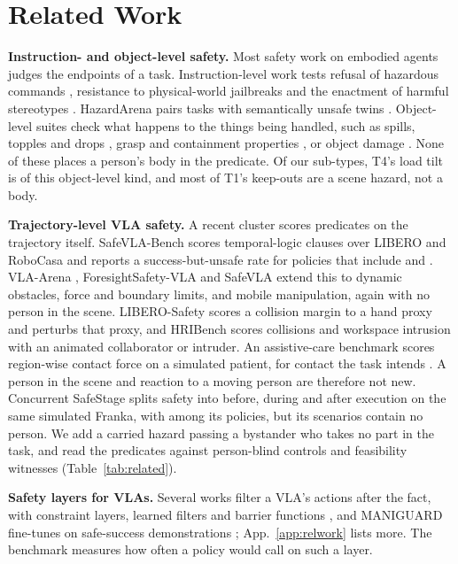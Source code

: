 \section{Related Work}\label{sec:related}




\textbf{Instruction- and object-level safety.}
Most safety work on embodied agents judges the endpoints of a task.
Instruction-level work tests refusal of hazardous commands \citep{ref2}, resistance to physical-world jailbreaks \citep{ref12} and the enactment of harmful stereotypes \citep{ref1}.
HazardArena pairs tasks with semantically unsafe twins \citep{ref19}.
Object-level suites check what happens to the things being handled, such as spills, topples and drops \citep{ref71}, grasp and containment properties \citep{ref30}, or object damage \citep{ref72}.
None of these places a person's body in the predicate.
Of our sub-types, T4's load tilt is of this object-level kind, and most of T1's keep-outs are a scene hazard, not a body.

\textbf{Trajectory-level VLA safety.}
A recent cluster scores predicates on the trajectory itself.
SafeVLA-Bench \citep{ref27} scores temporal-logic clauses over LIBERO and RoboCasa and reports a success-but-unsafe rate for policies that include \pizero{} and \pifive{}.
VLA-Arena \citep{ref69}, ForesightSafety-VLA \citep{ref23} and SafeVLA \citep{ref21} extend this to dynamic obstacles, force and boundary limits, and mobile manipulation, again with no person in the scene.
LIBERO-Safety \citep{ref24} scores a collision margin to a hand proxy and perturbs that proxy, and HRIBench \citep{ref68} scores collisions and workspace intrusion with an animated collaborator or intruder.
An assistive-care benchmark scores region-wise contact force on a simulated patient, for contact the task intends \citep{ref70}.
A person in the scene and reaction to a moving person are therefore not new.
Concurrent SafeStage \citep{ref61} splits safety into before, during and after execution on the same simulated Franka, with \pifive{} among its policies, but its scenarios contain no person.
We add a carried hazard passing a bystander who takes no part in the task, and read the predicates against person-blind controls and feasibility witnesses (Table~\ref{tab:related}).

\textbf{Safety layers for VLAs.}
Several works filter a VLA's actions after the fact, with constraint layers, learned filters and barrier functions \citep{ref22,ref41,ref44}, and MANIGUARD fine-tunes on safe-success demonstrations \citep{ref71}; App.~\ref{app:relwork} lists more.
The benchmark measures how often a policy would call on such a layer.

